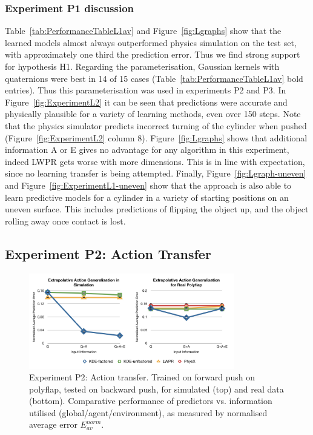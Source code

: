 \subsubsection{Experiment P1 discussion} Table~\ref{tab:PerformanceTableL1av} and Figure~\ref{fig:Lgraphs} show that the learned models almost always outperformed physics simulation on the test set, with approximately one third the prediction error. Thus we find strong support for hypothesis H1. Regarding the parameterisation, Gaussian kernels with quaternions were best in 14 of 15 cases  (Table~\ref{tab:PerformanceTableL1av} bold entries). Thus this parameterisation was used in experiments P2 and P3.
In Figure~\ref{fig:ExperimentL2} it can be
seen that predictions were accurate and physically plausible for a
variety of learning methods, even over 150 steps. Note that the physics
simulator predicts incorrect turning of the cylinder when pushed
(Figure~\ref{fig:ExperimentL2} column 8). Figure~\ref{fig:Lgraphs} shows that additional information A or E gives no advantage for any algorithm in this experiment, indeed LWPR gets worse with more dimensions. This is in line with expectation, since no learning transfer is being attempted. Finally, Figure~\ref{fig:Lgraph-uneven} and Figure~\ref{fig:ExperimentL1-uneven} show that the approach is also able to learn predictive models for a cylinder in a variety of starting positions on an uneven surface. This includes predictions of flipping the object up, and the object rolling away once contact is lost.

\subsection{Experiment P2: Action Transfer}
\label{sec:Results.Action}

\begin{figure}[t]
\centerline{\includegraphics[width=0.8\textwidth]{./P2-graphs}}
\caption{Experiment P2: Action transfer. Trained on forward push on polyflap, tested on backward push, for simulated (top) and real data (bottom). Comparative performance of predictors vs. information utilised (global/agent/environment),
as measured by normalised average error ${E_{av}^{norm}}$.
}\label{fig:A_av_graphs}
\end{figure}

